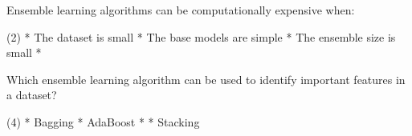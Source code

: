 \documentclass[11pt]{extarticle}
\begin{document}
\begin{exercise}
    Ensemble learning algorithms can be computationally expensive when:
    \begin{choice} (2)
        * The dataset is small
        * The base models are simple
        * The ensemble size is small
        * 
    \end{choice}
\end{exercise}
\begin{solution}
\end{solution}

\begin{exercise}
    Which ensemble learning algorithm can be used to identify important features in a dataset?
    \begin{choice} (4)
        * Bagging
        * AdaBoost
        * 
        * Stacking
    \end{choice}
\end{exercise}
\begin{solution}
\end{solution}

\newpage
\begin{multicols*}{2}
    \printsolutions*
\end{multicols*}
\end{document}
